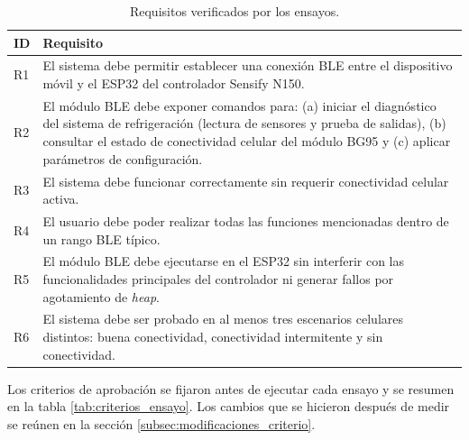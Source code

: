 \begin{table}[htbp]
\centering
\caption{Requisitos verificados por los ensayos.}
\label{tab:requisitos_ensayo}
\small
\begin{tabular}{L{0.08\textwidth} L{0.82\textwidth}}
\toprule
\textbf{ID} & \textbf{Requisito} \\
\midrule
R1 & El sistema debe permitir establecer una conexión BLE entre el dispositivo móvil y el ESP32 del controlador Sensify N150. \\
R2 & El módulo BLE debe exponer comandos para: (a) iniciar el diagnóstico del sistema de refrigeración (lectura de sensores y prueba de salidas), (b) consultar el estado de conectividad celular del módulo BG95 y (c) aplicar parámetros de configuración. \\
R3 & El sistema debe funcionar correctamente sin requerir conectividad celular activa. \\
R4 & El usuario debe poder realizar todas las funciones mencionadas dentro de un rango BLE típico. \\
R5 & El módulo BLE debe ejecutarse en el ESP32 sin interferir con las funcionalidades principales del controlador ni generar fallos por agotamiento de \textit{heap}. \\
R6 & El sistema debe ser probado en al menos tres escenarios celulares distintos: buena conectividad, conectividad intermitente y sin conectividad. \\
\bottomrule
\end{tabular}
\end{table}

Los criterios de aprobación se fijaron antes de ejecutar cada ensayo y se resumen en la tabla \ref{tab:criterios_ensayo}. Los cambios que se hicieron después de medir se reúnen en la sección \ref{subsec:modificaciones_criterio}.

